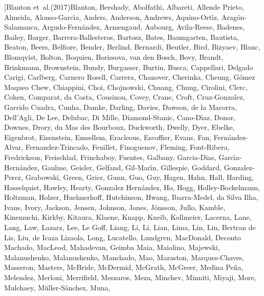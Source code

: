 \documentclass[longauth]{aa} %
\begin{document}
\begin{thebibliography}{112}
	\bibitem[{{Blanton} {et~al.}(2017){Blanton}, {Bershady}, {Abolfathi},
		{Albareti}, {Allende Prieto}, {Almeida}, {Alonso-Garc{\'\i}a}, {Anders},
		{Anderson}, {Andrews}, {Aquino-Ort{\'\i}z}, {Arag{\'o}n-Salamanca},
		{Argudo-Fern{\'a}ndez}, {Armengaud}, {Aubourg}, {Avila-Reese}, {Badenes},
		{Bailey}, {Barger}, {Barrera-Ballesteros}, {Bartosz}, {Bates}, {Baumgarten},
		{Bautista}, {Beaton}, {Beers}, {Belfiore}, {Bender}, {Berlind}, {Bernardi},
		{Beutler}, {Bird}, {Bizyaev}, {Blanc}, {Blomqvist}, {Bolton}, {Boquien},
		{Borissova}, {van den Bosch}, {Bovy}, {Brandt}, {Brinkmann}, {Brownstein},
		{Bundy}, {Burgasser}, {Burtin}, {Busca}, {Cappellari}, {Delgado Carigi},
		{Carlberg}, {Carnero Rosell}, {Carrera}, {Chanover}, {Cherinka}, {Cheung},
		{G{\'o}mez Maqueo Chew}, {Chiappini}, {Choi}, {Chojnowski}, {Chuang},
		{Chung}, {Cirolini}, {Clerc}, {Cohen}, {Comparat}, {da Costa}, {Cousinou},
		{Covey}, {Crane}, {Croft}, {Cruz-Gonzalez}, {Garrido Cuadra}, {Cunha},
		{Damke}, {Darling}, {Davies}, {Dawson}, {de la Macorra}, {Dell'Agli}, {De
			Lee}, {Delubac}, {Di Mille}, {Diamond-Stanic}, {Cano-D{\'\i}az}, {Donor},
		{Downes}, {Drory}, {du Mas des Bourboux}, {Duckworth}, {Dwelly}, {Dyer},
		{Ebelke}, {Eigenbrot}, {Eisenstein}, {Emsellem}, {Eracleous}, {Escoffier},
		{Evans}, {Fan}, {Fern{\'a}ndez-Alvar}, {Fernandez-Trincado}, {Feuillet},
		{Finoguenov}, {Fleming}, {Font-Ribera}, {Fredrickson}, {Freischlad},
		{Frinchaboy}, {Fuentes}, {Galbany}, {Garcia-Dias},
		{Garc{\'\i}a-Hern{\'a}ndez}, {Gaulme}, {Geisler}, {Gelfand},
		{Gil-Mar{\'\i}n}, {Gillespie}, {Goddard}, {Gonzalez-Perez}, {Grabowski},
		{Green}, {Grier}, {Gunn}, {Guo}, {Guy}, {Hagen}, {Hahn}, {Hall}, {Harding},
		{Hasselquist}, {Hawley}, {Hearty}, {Gonzalez Hern{\'a}ndez}, {Ho}, {Hogg},
		{Holley-Bockelmann}, {Holtzman}, {Holzer}, {Huehnerhoff}, {Hutchinson},
		{Hwang}, {Ibarra-Medel}, {da Silva Ilha}, {Ivans}, {Ivory}, {Jackson},
		{Jensen}, {Johnson}, {Jones}, {J{\"o}nsson}, {Jullo}, {Kamble}, {Kinemuchi},
		{Kirkby}, {Kitaura}, {Klaene}, {Knapp}, {Kneib}, {Kollmeier}, {Lacerna},
		{Lane}, {Lang}, {Law}, {Lazarz}, {Lee}, {Le Goff}, {Liang}, {Li}, {Li},
		{Lian}, {Lima}, {Lin}, {Lin}, {Bertran de Lis}, {Liu}, {de Icaza Lizaola},
		{Long}, {Lucatello}, {Lundgren}, {MacDonald}, {Deconto Machado}, {MacLeod},
		{Mahadevan}, {Geimba Maia}, {Maiolino}, {Majewski}, {Malanushenko},
		{Malanushenko}, {Manchado}, {Mao}, {Maraston}, {Marques-Chaves}, {Masseron},
		{Masters}, {McBride}, {McDermid}, {McGrath}, {McGreer}, {Medina Pe{\~n}a},
		{Melendez}, {Merloni}, {Merrifield}, {Meszaros}, {Meza}, {Minchev},
		{Minniti}, {Miyaji}, {More}, {Mulchaey}, {M{\"u}ller-S{\'a}nchez}, {Muna},
}
\end{thebibliography}
\end{document}
